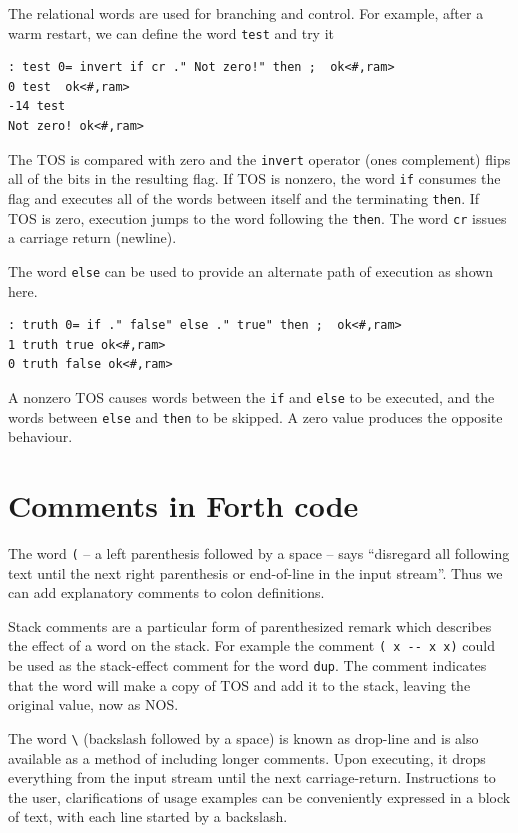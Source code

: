 \documentclass[12pt,a4paper]{article}
\begin{document}
\medskip
The relational words are used for branching and control.
For example, after a warm restart, we can define the word \verb!test! and try it
\begin{verbatim}
: test 0= invert if cr ." Not zero!" then ;  ok<#,ram>
0 test  ok<#,ram>
-14 test 
Not zero! ok<#,ram>
\end{verbatim}
The TOS is compared with zero and the \verb!invert! operator (ones complement) flips
all of the bits in the resulting flag.
If TOS is nonzero, the word \verb!if! consumes the flag and executes all of the words
between itself and the terminating \verb!then!.
If TOS is zero, execution jumps to the word following the \verb!then!.
The word \verb!cr! issues a carriage return (newline).

\medskip
The word \verb!else! can be used to provide an alternate path of execution as shown here.
\begin{verbatim}
: truth 0= if ." false" else ." true" then ;  ok<#,ram>
1 truth true ok<#,ram>
0 truth false ok<#,ram>
\end{verbatim}
A nonzero TOS causes words between the \verb!if! and \verb!else! to be executed,
and the words between \verb!else! and \verb!then! to be skipped.
A zero value produces the opposite behaviour.


\newpage
\section{Comments in Forth code}
\label{sec:commenting}
%
The word \verb!(! -- a left parenthesis followed by a space -- 
says ``disregard all following text until the next right parenthesis 
or end-of-line in the input stream''.
Thus we can add explanatory comments to colon definitions.

\medskip
Stack comments are a particular form of parenthesized remark which describes
the effect of a word on the stack.
For example the comment \verb!( x -- x x)! could be used as the stack-effect comment 
for the word \verb!dup!.
The comment indicates that the word will make a copy of TOS and add it to the stack,
leaving the original value, now as NOS.

\medskip
The word \verb!\! (backslash followed by a space) is known as drop-line and is also
available as a method of including longer comments.
Upon executing, it drops everything from the input stream until the next carriage-return.
Instructions to the user, clarifications of usage examples can be conveniently expressed
in a block of text, with each line started by a backslash.
\end{document}
